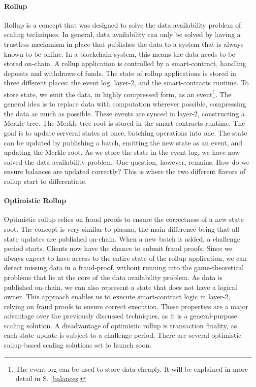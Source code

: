 \documentclass[../../thesis.tex]{subfiles}
\begin{document}
\paragraph{Rollup}
Rollup is a concept that was designed to solve the data availability problem of scaling techniques. In general, data availability can only be solved by having a trustless mechanism in place that publishes the data to a system that is always known to be online. In a blockchain system, this means the data needs to be stored on-chain. A rollup application is controlled by a smart-contract, handling deposits and withdraws of funds. The state of rollup applications is stored in three different places: the event log, layer-2, and the smart-contracts runtime. To store state, we emit the data, in highly compressed form, as an event\footnote{The event log can be used to store data cheaply. It will be explained in more detail in S. \ref{balances}}. The general idea is to replace data with computation wherever possible, compressing the data as much as possible. These events are synced in layer-2, constructing a Merkle tree. The Merkle tree root is stored in the smart-contracts runtime. The goal is to update serveral states at once, batching operations into one. The state can be updated by publishing a batch, emitting the new state as an event, and updating the Merkle root. As we store the state in the event log, we have now solved the data availability problem. One question, however, remains. How do we ensure balances are updated correctly? This is where the two different flavors of rollup start to differentiate.

\paragraph{Optimistic Rollup}
Optimistic rollup relies on fraud proofs to ensure the correctness of a new state root. The concept is very similar to plasma, the main difference being that all state updates are published on-chain. When a new batch is added, a challenge period starts. Clients now have the chance to submit fraud proofs. Since we always expect to have access to the entire state of the rollup application, we can detect missing data in a fraud-proof, without running into the game-theoretical problems that lie at the core of the data availability problem. As data is published on-chain, we can also represent a state that does not have a logical owner. This approach enables us to execute smart-contract logic in layer-2, relying on fraud proofs to ensure correct execution. These properties are a major advantage over the previously discussed techniques, as it is a general-purpose scaling solution. A disadvantage of optimistic rollup is transaction finality, as each state update is subject to a challenge period. There are several optimistic rollup-based scaling solutions set to launch soon. 
\end{document}
